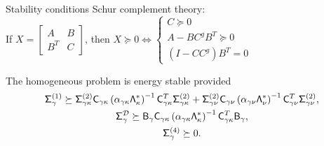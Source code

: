 \documentclass{beamer}
\begin{document}
\begin{frame}{Stability conditions}
    Schur complement theory: \\
    \vskip 3mm
    \centering
    If $X = \begin{bmatrix}
    A & B \\ B^T & C
    \end{bmatrix}$, then $X\succeq 0 \iff \begin{cases}
    C \succeq 0 \\
    A-BC^gB^T\succeq 0 \\
    (I - CC^g)B^T=0
    \end{cases}$
    \vskip 5mm
    \begin{block}{}
        The homogeneous problem is energy stable provided
       \begin{gather*}
       \mathsf{\Sigma}_{\gamma}^{(1)} \succeq \mathsf{\Sigma}_{\gamma\kappa}^{(2)} \mathsf{C}_{\gamma\kappa}
       \left(\alpha_{\gamma\kappa}\mathsf{\Lambda}_{\kappa}^{*}\right)^{-1}\mathsf{C}_{\gamma\kappa}^T \mathsf{\Sigma}_{\gamma\kappa}^{(2)}
       + \mathsf{\Sigma}_{\gamma\nu} ^{(2)} \mathsf{C}_{\gamma\nu} \left(\alpha_{\gamma\nu} \mathsf{\Lambda}_{\nu}^{*}\right)^{-1}\mathsf{C}_{\gamma\nu}^T \mathsf{\Sigma}_{\gamma\nu} ^{(2)}, \\
       \mathsf{\Sigma}_{\gamma}^{\mathcal{D}} \succeq \mathsf{B}_{\gamma} \mathsf{C}_{\gamma\kappa}
       \left(\alpha_{\gamma\kappa}\mathsf{\Lambda}_{\kappa}^{*}\right)^{-1}\mathsf{C}_{\gamma\kappa}^T \mathsf{B}_{\gamma} ,\\
       \mathsf{\Sigma}_{\gamma}^{(4)} \succeq 0.
       \end{gather*}
    \end{block}
\end{frame}
\end{document}
